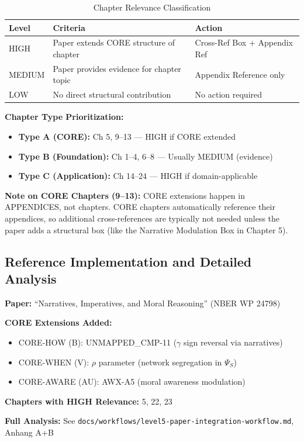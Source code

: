 \begin{table}[htbp]
\centering
\caption{Chapter Relevance Classification}
\label{tab:chapter-relevance}
\begin{tabular}{@{}lp{6cm}l@{}}
\toprule
\textbf{Level} & \textbf{Criteria} & \textbf{Action} \\
\midrule
HIGH & Paper extends CORE structure of chapter & Cross-Ref Box + Appendix Ref \\
MEDIUM & Paper provides evidence for chapter topic & Appendix Reference only \\
LOW & No direct structural contribution & No action required \\
\bottomrule
\end{tabular}
\end{table}

\textbf{Chapter Type Prioritization:}
\begin{itemize}
    \item \textbf{Type A (CORE):} Ch 5, 9--13 --- HIGH if CORE extended
    \item \textbf{Type B (Foundation):} Ch 1--4, 6--8 --- Usually MEDIUM (evidence)
    \item \textbf{Type C (Application):} Ch 14--24 --- HIGH if domain-applicable
\end{itemize}

\textbf{Note on CORE Chapters (9--13):} CORE extensions happen in APPENDICES, not chapters. CORE chapters automatically reference their appendices, so additional cross-references are typically not needed unless the paper adds a structural box (like the Narrative Modulation Box in Chapter 5).

\subsection{Reference Implementation and Detailed Analysis}
\label{sec:paperint-reference-impl}

\begin{tcolorbox}[colback=green!5!white, colframe=green!60!black,
    title=Reference Implementation: Bénabou, Falk \& Tirole (2018)]
\textbf{Paper:} ``Narratives, Imperatives, and Moral Reasoning'' (NBER WP 24798)

\textbf{CORE Extensions Added:}
\begin{itemize}
    \item CORE-HOW (B): UNMAPPED_CMP-11 ($\gamma$ sign reversal via narratives)
    \item CORE-WHEN (V): $\rho$ parameter (network segregation in $\Psi_S$)
    \item CORE-AWARE (AU): AWX-A5 (moral awareness modulation)
\end{itemize}

\textbf{Chapters with HIGH Relevance:} 5, 22, 23

\textbf{Full Analysis:} See \texttt{docs/workflows/level5-paper-integration-workflow.md}, Anhang A+B
\end{tcolorbox}

